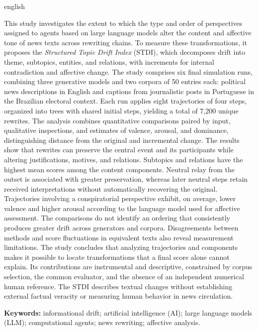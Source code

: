 \begin{resumo}[Abstract]
\begin{otherlanguage*}{english}
\begin{SingleSpace}
This study investigates the extent to which the type and order of perspectives assigned to agents based on large language models alter the content and affective tone of news texts across rewriting chains. To measure these transformations, it proposes the \textit{Structured Topic Drift Index} (STDI), which decomposes drift into theme, subtopics, entities, and relations, with increments for internal contradiction and affective change. The study comprises six final simulation runs, combining three generative models and two corpora of 50 entries each: political news descriptions in English and captions from journalistic posts in Portuguese in the Brazilian electoral context. Each run applies eight trajectories of four steps, organized into trees with shared initial steps, yielding a total of 7,200 unique rewrites. The analysis combines quantitative comparisons paired by input, qualitative inspections, and estimates of valence, arousal, and dominance, distinguishing distance from the original and incremental change. The results show that rewrites can preserve the central event and its participants while altering justifications, motives, and relations. Subtopics and relations have the highest mean scores among the content components. Neutral relay from the outset is associated with greater preservation, whereas later neutral steps retain received interpretations without automatically recovering the original. Trajectories involving a conspiratorial perspective exhibit, on average, lower valence and higher arousal according to the language model used for affective assessment. The comparisons do not identify an ordering that consistently produces greater drift across generators and corpora. Disagreements between methods and score fluctuations in equivalent texts also reveal measurement limitations. The study concludes that analyzing trajectories and components makes it possible to locate transformations that a final score alone cannot explain. Its contributions are instrumental and descriptive, constrained by corpus selection, the common evaluator, and the absence of an independent numerical human reference. The STDI describes textual changes without establishing external factual veracity or measuring human behavior in news circulation.
\end{SingleSpace}

\vspace{\onelineskip}
\textbf{Keywords:} informational drift; artificial intelligence (AI); large language models (LLM); computational agents; news rewriting; affective analysis.

\end{otherlanguage*}
\end{resumo}
